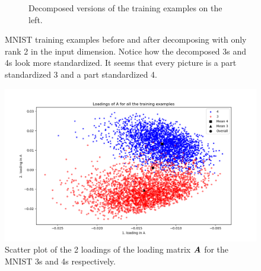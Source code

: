 \begin{figure}
\begin{subfigure}{0.45\linewidth}
        \captionsetup{width=.8\linewidth}
        \caption{Decomposed versions of the training examples on the left.}
    \end{subfigure}
    \captionsetup{width=.95\linewidth}
    \caption{MNIST training examples before and after decomposing with only rank 2 in the input dimension. Notice how the decomposed 3s and 4s look more standardized. It seems that every picture is a part standardized 3 and a part standardized 4. }
    \label{fig:decompExample3_4}
\end{figure}

\begin{figure}
    \centering
    \includegraphics[width=\linewidth]{Pics/05_methodology/LoadingsOfAScatterMNIST.png}
    \caption{Scatter plot of the 2 loadings of the loading matrix $\boldsymbol{A}$ for the MNIST 3s and 4s respectively.}
    \label{fig:my_label}
\end{figure}
